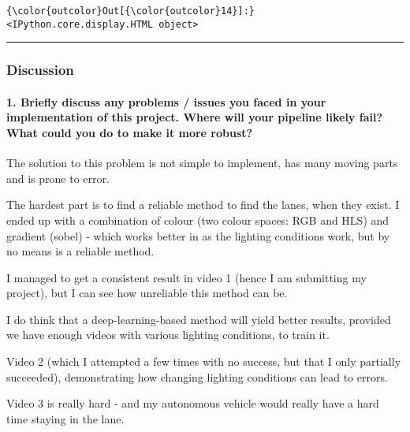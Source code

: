 \documentclass[11pt]{article}
\begin{document}
\begin{Verbatim}[commandchars=\\\{\}]
{\color{outcolor}Out[{\color{outcolor}14}]:} <IPython.core.display.HTML object>
\end{Verbatim}
            
    \begin{center}\rule{0.5\linewidth}{\linethickness}\end{center}

\hypertarget{discussion}{%
\subsubsection{Discussion}\label{discussion}}

\hypertarget{briefly-discuss-any-problems-issues-you-faced-in-your-implementation-of-this-project.-where-will-your-pipeline-likely-fail-what-could-you-do-to-make-it-more-robust}{%
\paragraph{1. Briefly discuss any problems / issues you faced in your
implementation of this project. Where will your pipeline likely fail?
What could you do to make it more
robust?}\label{briefly-discuss-any-problems-issues-you-faced-in-your-implementation-of-this-project.-where-will-your-pipeline-likely-fail-what-could-you-do-to-make-it-more-robust}}

The solution to this problem is not simple to implement, has many moving
parts and is prone to error.

The hardest part is to find a reliable method to find the lanes, when
they exist. I ended up with a combination of colour (two colour spaces:
RGB and HLS) and gradient (sobel) - which works better in as the
lighting conditions work, but by no means is a reliable method.

I managed to get a consistent result in video 1 (hence I am submitting
my project), but I can see how unreliable this method can be.

I do think that a deep-learning-based method will yield better results,
provided we have enough videos with various lighting conditions, to
train it.

Video 2 (which I attempted a few times with no success, but that I only
partially succeeded), demonstrating how changing lighting conditions can
lead to errors.

Video 3 is really hard - and my autonomous vehicle would really have a
hard time staying in the lane.
\end{document}
